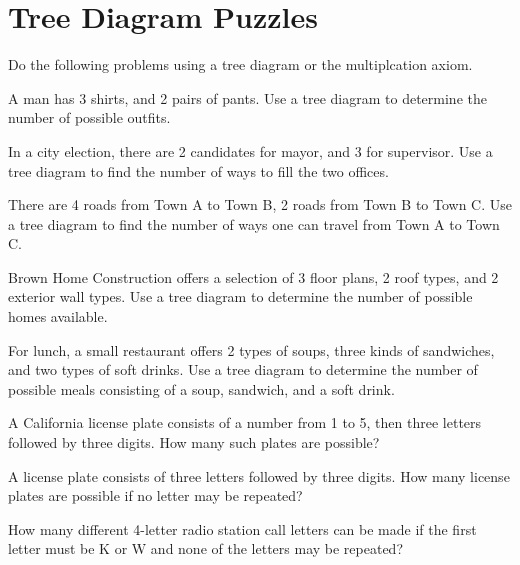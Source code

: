 \section{Tree Diagram Puzzles}

Do the following problems using a tree diagram or the multiplcation axiom.

\begin{puzzle}
    A man has 3 shirts, and 2 pairs of pants. Use a tree diagram to determine the number of possible outfits.
\end{puzzle}

\begin{puzzle}
    In a city election, there are 2 candidates for mayor, and 3 for supervisor. Use a tree diagram to find the number of ways to fill the two offices.
\end{puzzle}

\begin{puzzle}
    There are 4 roads from Town A to Town B, 2 roads from Town B to Town C. Use a tree diagram to find the number of ways one can travel from Town A to Town C.
\end{puzzle}

\begin{puzzle}
    Brown Home Construction offers a selection of 3 floor plans, 2 roof types, and 2 exterior wall types. Use a tree diagram to determine the number of possible homes available.
\end{puzzle}

\begin{puzzle}
    For lunch, a small restaurant offers 2 types of soups, three kinds of sandwiches, and two types of soft drinks. Use a tree diagram to determine the number of possible meals consisting of a soup, sandwich, and a soft drink.
\end{puzzle}

\begin{puzzle}
    A California license plate consists of a number from 1 to 5, then three letters followed by three digits. How many such plates are possible?
\end{puzzle}

\begin{puzzle}
    A license plate consists of three letters followed by three digits. How many license plates are possible if no letter may be repeated?
\end{puzzle}

\begin{puzzle}
    How many different 4-letter radio station call letters can be made if the first letter must be K or W and none of the letters may be repeated?
\end{puzzle}

